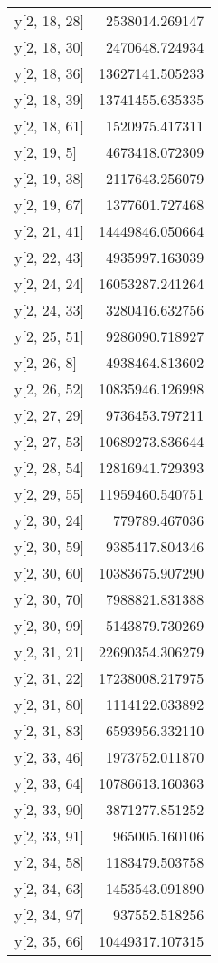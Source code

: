 \begin{longtable}{lr}
y[2, 18, 28] & 2538014.269147 \\
y[2, 18, 30] & 2470648.724934 \\
y[2, 18, 36] & 13627141.505233 \\
y[2, 18, 39] & 13741455.635335 \\
y[2, 18, 61] & 1520975.417311 \\
y[2, 19, 5] & 4673418.072309 \\
y[2, 19, 38] & 2117643.256079 \\
y[2, 19, 67] & 1377601.727468 \\
y[2, 21, 41] & 14449846.050664 \\
y[2, 22, 43] & 4935997.163039 \\
y[2, 24, 24] & 16053287.241264 \\
y[2, 24, 33] & 3280416.632756 \\
y[2, 25, 51] & 9286090.718927 \\
y[2, 26, 8] & 4938464.813602 \\
y[2, 26, 52] & 10835946.126998 \\
y[2, 27, 29] & 9736453.797211 \\
y[2, 27, 53] & 10689273.836644 \\
y[2, 28, 54] & 12816941.729393 \\
y[2, 29, 55] & 11959460.540751 \\
y[2, 30, 24] & 779789.467036 \\
y[2, 30, 59] & 9385417.804346 \\
y[2, 30, 60] & 10383675.907290 \\
y[2, 30, 70] & 7988821.831388 \\
y[2, 30, 99] & 5143879.730269 \\
y[2, 31, 21] & 22690354.306279 \\
y[2, 31, 22] & 17238008.217975 \\
y[2, 31, 80] & 1114122.033892 \\
y[2, 31, 83] & 6593956.332110 \\
y[2, 33, 46] & 1973752.011870 \\
y[2, 33, 64] & 10786613.160363 \\
y[2, 33, 90] & 3871277.851252 \\
y[2, 33, 91] & 965005.160106 \\
y[2, 34, 58] & 1183479.503758 \\
y[2, 34, 63] & 1453543.091890 \\
y[2, 34, 97] & 937552.518256 \\
y[2, 35, 66] & 10449317.107315 \\

\end{longtable}
